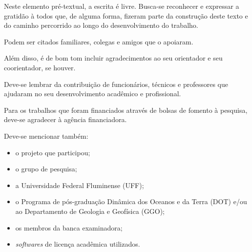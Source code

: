 \begin{agradecimentos}
    \fonteAgradecimentos 
    
    \noindent Neste elemento pré-textual, a escrita é livre. Busca-se reconhecer e expressar a gratidão à todos que, de alguma forma, fizeram parte da construção deste texto e do caminho percorrido ao longo do desenvolvimento do trabalho.
        
    \noindent Podem ser citados familiares, colegas e amigos que o apoiaram. 
        
    \noindent Além disso, é de bom tom incluir agradecimentos ao seu orientador e seu coorientador, se houver. 
    
    \noindent Deve-se lembrar da contribuição de funcionários, técnicos e professores que ajudaram no seu desenvolvimento acadêmico e profissional.
    
    \noindent Para os trabalhos que foram financiados através de bolsas de fomento à pesquisa, deve-se agradecer à agência financiadora.
    
    \noindent Deve-se mencionar também:
    
    \vspace{-.5cm}
    
    \begin{itemize}
        \item o projeto que participou;
        \item o grupo de pesquisa;
        \item a Universidade Federal Fluminense (UFF);
        \item o Programa de pós-graduação Dinâmica dos Oceanos e da Terra (DOT) e/ou ao Departamento de Geologia e Geofísica (GGO);
        \item os membros da banca examinadora;
        \item \textit{softwares} de licença acadêmica utilizados.
    \end{itemize}
\end{agradecimentos}